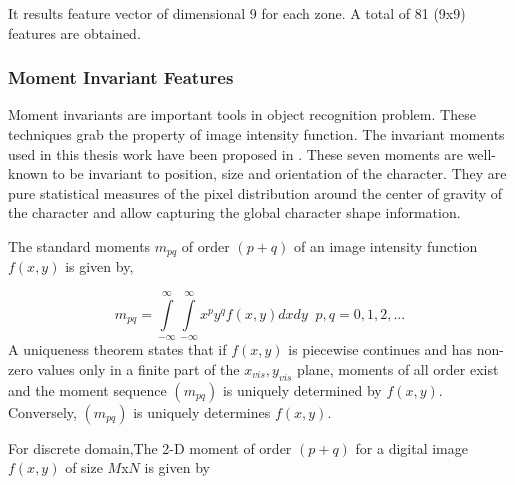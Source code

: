 \documentclass[12pt,a4paper,oneside]{article}
\numberwithin{equation}{section}
\numberwithin{algorithm}{section}
\begin{document}
	
	It results feature vector of dimensional 9 for each zone. A total of 81 (9x9) features are obtained.
	
	\subsubsection{Moment Invariant Features}
	\label{moment_invariant_features}
	Moment invariants are important tools in object recognition problem. These techniques grab the property of image intensity function.
	The invariant moments used in this thesis work have been proposed in \cite{Hu1962}. These seven moments are well-known to be invariant to position, size and orientation of the character. They are pure statistical measures of the pixel distribution around the center of gravity of the character and allow capturing the global character shape information.
	
	The standard moments $m_{pq}$ of order $(p+q)$ of an image intensity function $f(x,y)$ is given by,
	
	\begin{equation}\label{equation_moments}
	m_{pq}=\int\limits_{-\infty}^{\infty}\int\limits_{-\infty}^{\infty}x^py^qf(x,y)dxdy \;\;  p,q = 0,1 , 2, ...
	\end{equation}
	A uniqueness theorem states that if $f(x,y)$ is piecewise continues and has non-zero values only in a finite part of the $x_{vis},y_{vis}$ plane, moments of all order exist and the moment sequence $(m_{pq})$ is uniquely determined by $f(x,y)$. Conversely, $(m_{pq})$ is uniquely determines $f(x,y)$.
	
	For discrete domain,The 2-D moment of order $(p+q)$ for a digital image $f(x,y)$ of size $M$x$N$ is given by
	
\end{document}
